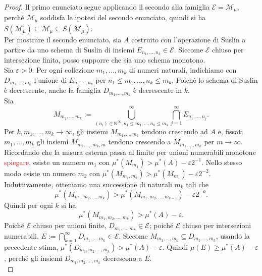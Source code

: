 \documentclass[a4paper, twoside,openright]{article}
\newcommand{\<}{\langle}
\renewcommand{\>}{\rangle}
\begin{document}
\begin{proof}
	Il primo enunciato segue applicando il secondo alla famiglia $\mathcal{E}=\mathcal{M}_{\mu}$, perché $\mathcal{M}_{\mu}$ soddisfa le ipotesi del secondo enunciato, quindi si ha $S(\mathcal{M}_{\mu}) \subseteq \mathcal{M}_{\mu} \subseteq S(\mathcal{M}_{\mu})$.\\
	Per mostrare il secondo enunciato, sia $A$ costruito con l'operazione di Suslin a partire da uno schema di Suslin di insiemi $E_{n_{1}, \ldots, n_{k}} \in \mathcal{E}$. Siccome $\mathcal{E}$ chiuso per intersezione finita, posso supporre che sia uno schema monotono.\\
	Sia $\varepsilon>0$. Per ogni collezione $m_{1}, \ldots, m_{k}$ di numeri naturali, indichiamo con $D_{m_{1}, \ldots, m_{k}}$ l'unione di $E_{n_{1}, \ldots, n_{k}}$ per $n_{1} \leq m_{1}, \ldots, n_{k} \leq m_{k}$. Poiché lo schema di Suslin è decrescente, anche la famiglia $D_{m_1,...,m_k}$ è decrescente in $k$.\\
	Sia
	$$
	M_{m_{1}, \ldots, m_{k}}:=\bigcup_{\left(n_{i}\right) \in \mathbb{N}^{\infty}, n_{1} \leq m_{1}, \ldots, n_{k} \leq m_{k}}^{\infty} \bigcap_{j=1}^{\infty} E_{n_{1}, \ldots, n_{j}} .
	$$
	Per $k, m_1,...,m_k \rightarrow \infty$, gli insiemi $M_{m_1,...,m_k}$ tendono crescendo ad $A$ e, fissati $m_{1}, \ldots, m_{k}$ gli insiemi $M_{m_{1}, \ldots, m_{k}, m}$  tendono crescendo a $M_{m_{1}, \ldots, m_{k}}$ per $m \rightarrow \infty$.\\
	Ricordando che la misura esterna passa al limite per unioni numerabili monotone  \textcolor{red}{spiegare}, esiste un numero $m_{1}$ con $\mu^{*}\left(M_{m_{1}}\right)>\mu^{*}(A)-\varepsilon 2^{-1}$. Nello stesso modo esiste un numero $m_{2}$ con $\mu^{*}\left(M_{m_{1}, m_{2}}\right)>\mu^{*}\left(M_{m_{1}}\right)-\varepsilon 2^{-2}$. Induttivamente, otteniamo una successione di naturali $m_{k}$ tali che
	$$
	\mu^{*}\left(M_{m_{1}, m_{2}, \ldots, m_{k}}\right)>\mu^{*}\left(M_{m_{1}, m_{2}, \ldots, m_{k-1}}\right)-\varepsilon 2^{-k} .
	$$
	Quindi per ogni $k$ si ha
	$$
	\mu^{*}\left(M_{m_{1}, m_{2}, \ldots, m_{k}}\right)>\mu^{*}(A)-\varepsilon .
	$$
	Poiché $\mathcal{E}$ chiuso per unioni finite, $D_{m_{1}, \ldots, m_{k}} \in \mathcal{E}$; poiché $\mathcal{E}$ chiuso per intersezioni numerabili, $E:=\bigcap_{k=1}^{\infty} D_{m_{1}, \ldots, m_{k}} \in \mathcal{E}$. Siccome $M_{m_{1}, \ldots, m_{k}} \subseteq D_{m_{1}, \ldots, m_{k}}$, usando la precedente stima, $\mu^{*}\left(D_{m_{1}, m_{2}, \ldots, m_{k}}\right)>\mu^{*}(A)-\varepsilon$. Quindi $\mu(E) \geq \mu^{*}(A)-\varepsilon$, perché gli insiemi $D_{m_{1}, m_{2}, \ldots, m_{k}}$ decrescono a $E$.\\

\end{proof}
\end{document}
